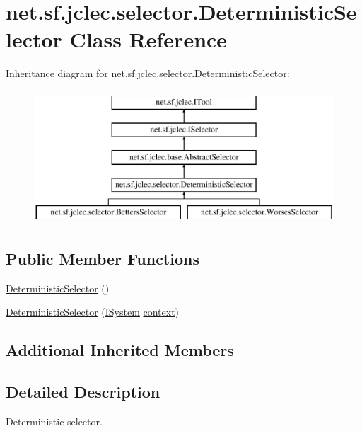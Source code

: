 \hypertarget{classnet_1_1sf_1_1jclec_1_1selector_1_1_deterministic_selector}{\section{net.\-sf.\-jclec.\-selector.\-Deterministic\-Selector Class Reference}
\label{classnet_1_1sf_1_1jclec_1_1selector_1_1_deterministic_selector}
}
Inheritance diagram for net.\-sf.\-jclec.\-selector.\-Deterministic\-Selector\-:\begin{figure}[H]
\begin{center}
\leavevmode
\includegraphics[height=5.000000cm]{classnet_1_1sf_1_1jclec_1_1selector_1_1_deterministic_selector}
\end{center}
\end{figure}
\subsection*{Public Member Functions}
\begin{DoxyCompactItemize}
\item 
\hyperlink{classnet_1_1sf_1_1jclec_1_1selector_1_1_deterministic_selector_a1bc263a207beaf9aa829e9eda078881f}{Deterministic\-Selector} ()
\item 
\hyperlink{classnet_1_1sf_1_1jclec_1_1selector_1_1_deterministic_selector_a475964d94625f72b2dbf473a363911b2}{Deterministic\-Selector} (\hyperlink{interfacenet_1_1sf_1_1jclec_1_1_i_system}{I\-System} \hyperlink{classnet_1_1sf_1_1jclec_1_1base_1_1_abstract_selector_a4304fe5c27aa7631dc91678d22473b94}{context})
\end{DoxyCompactItemize}
\subsection*{Additional Inherited Members}


\subsection{Detailed Description}
Deterministic selector.

